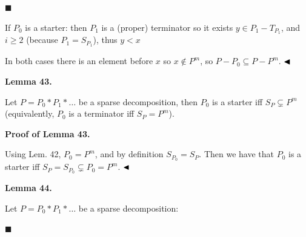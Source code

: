 \documentclass[10pt,a4paper]{article}
\begin{document}
 
\par\noindent  $\blacksquare$ 
 
If $P_{0}$ is a starter: then $P_{1}$ is a (proper) terminator so it exists $y\in P_{1}-T_{P_{1}}$, and $i\geqslant 2$ (because $P_{1}=S_{P_{1}}$), thus $y<x$\par
 
 
  
In both cases there is an element before $x$ so $x\not\in P^{m}$, so $P-P_{0}\subseteq P-P^{m}$. $\hfill\blacktriangleleft$\par
 
 
 
\par\medskip\noindent\textbf{Lemma 43.}\par
 
 
Let $P=P_{0}*P_{1}*\dots$ be a sparse decomposition, then $P_{0}$ is a starter iff $S_{P}\subsetneq P^{m}$ (equivalently, $P_{0}$ is a terminator iff $S_{P}=P^{m}$).\par
 
 
 
 
 
\par\medskip\noindent\textbf{Proof of Lemma 43.}\par
 
 
Using Lem. 42, $P_{0}=P^{m}$, and by definition $S_{P_{0}}=S_{P}$. Then we have that $P_{0}$ is a starter iff $S_{P}=S_{P_{0}}\subsetneq P_{0}=P^{m}$. $\hfill\blacktriangleleft$\par
 
 
 
\par\medskip\noindent\textbf{Lemma 44.}\par
 
 
Let $P=P_{0}*P_{1}*\dots$ be a sparse decomposition:\par
  
\par\noindent  $\blacksquare$ 
 
\end{document}
